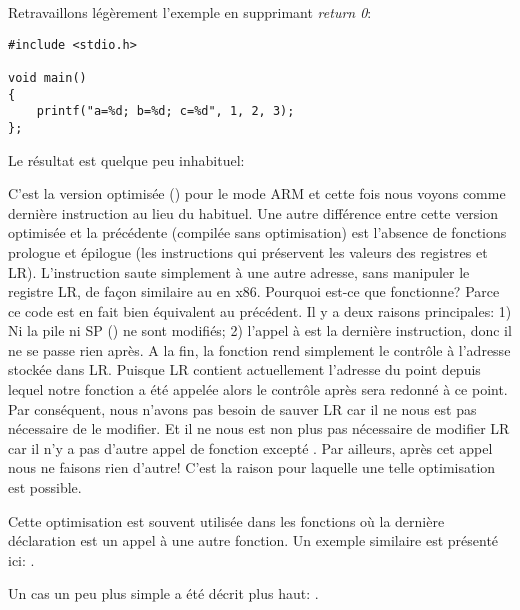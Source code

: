 \label{ARM_B_to_printf}

Retravaillons légèrement l'exemple en supprimant \emph{return 0}:

\begin{lstlisting}[style=customc]
#include <stdio.h>

void main()
{
	printf("a=%d; b=%d; c=%d", 1, 2, 3);
};
\end{lstlisting}

Le résultat est quelque peu inhabituel:



C'est la version optimisée (\Othree) pour le mode ARM et cette fois nous voyons
 comme dernière instruction au lieu du  habituel.
Une autre différence entre cette version optimisée et la précédente (compilée
sans optimisation) est l'absence de fonctions prologue et épilogue (les instructions
qui préservent les valeurs des registres  et \ac{LR}).
L'instruction  saute simplement à une autre adresse, sans manipuler le registre
\ac{LR}, de façon similaire au \JMP en x86.
Pourquoi est-ce que fonctionne? Parce ce code est en fait bien équivalent au précédent.
Il y a deux raisons principales: 1) Ni la pile ni \ac{SP} ()
ne sont modifiés;
2) l'appel à \printf est la dernière instruction, donc il ne se passe rien après.
A la fin, la fonction \printf rend simplement le contrôle à l'adresse stockée
dans \ac{LR}.
Puisque \ac{LR} contient actuellement l'adresse du point depuis lequel notre fonction
a été appelée alors le contrôle après \printf sera redonné à ce point.
Par conséquent, nous n'avons pas besoin de sauver \ac{LR} car il ne nous est pas
nécessaire de le modifier.
Et il ne nous est non plus pas nécessaire de modifier \ac{LR} car il n'y a pas d'autre
appel de fonction excepté \printf. Par ailleurs, après cet appel nous ne faisons
rien d'autre!
C'est la raison pour laquelle une telle optimisation est possible.

Cette optimisation est souvent utilisée dans les fonctions où la dernière déclaration
est un appel à une autre fonction.
Un exemple similaire est présenté ici:
.

Un cas un peu plus simple a été décrit plus haut: .

